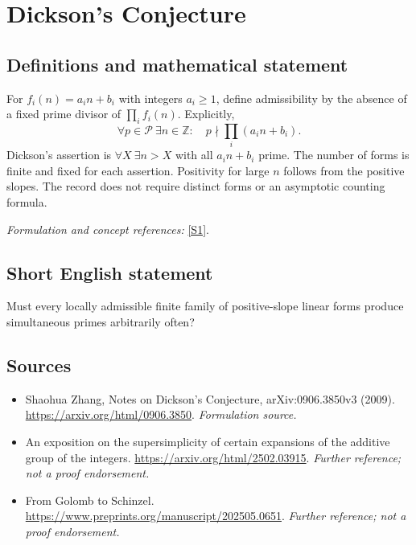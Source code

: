 \documentclass[11pt]{article}
\begin{document}
\section*{\texorpdfstring{Dickson's Conjecture}{Dickson's Conjecture}}\label{statement}
\subsection{Definitions and mathematical statement}
For $f_i(n)=a_in+b_i$ with integers $a_i\ge1$, define admissibility by the absence of a fixed prime divisor of $\prod_i f_i(n)$. Explicitly,
\[
 \forall p\in\mathcal P\ \exists n\in{\mathbb{Z}}:\quad p\nmid\prod_i(a_in+b_i).
\]
Dickson's assertion is $\forall X\ \exists n>X$ with all $a_in+b_i$ prime. The number of forms is finite and fixed for each assertion. Positivity for large $n$ follows from the positive slopes. The record does not require distinct forms or an asymptotic counting formula.
\par\smallskip\textit{Formulation and concept references:} \href{https://arxiv.org/html/0906.3850}{[S1]}.

\subsection{Short English statement}
Must every locally admissible finite family of positive-slope linear forms produce simultaneous primes arbitrarily often?
\subsection{Sources}
\begin{itemize}
\item[S1]Shaohua Zhang, Notes on Dickson's Conjecture, arXiv:0906.3850v3 (2009).
\url{https://arxiv.org/html/0906.3850}.
\textit{Formulation source.}
\item[S2]An exposition on the supersimplicity of certain expansions of the additive group of the integers.
\url{https://arxiv.org/html/2502.03915}.
\textit{Further reference; not a proof endorsement.}
\item[S3]From Golomb to Schinzel.
\url{https://www.preprints.org/manuscript/202505.0651}.
\textit{Further reference; not a proof endorsement.}
\end{itemize}
\end{document}
